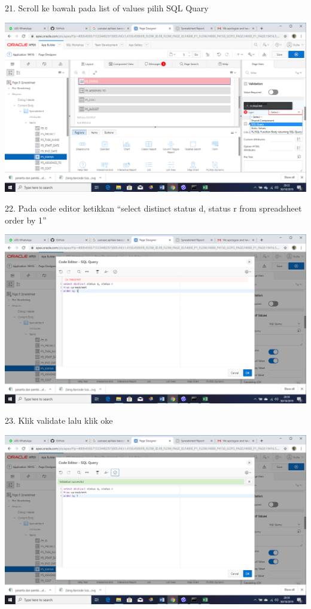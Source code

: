 \documentclass{article}
\begin{document}
\item 21.  Scroll ke bawah pada list of values pilih  SQL Quary
\begin{center}
    \includegraphics[width=10cm\textwidth]{figure/34.png}
\end{center}

\item 22. Pada code editor ketikkan “select distinct status d, status r from spreadsheet order by 1”
\begin{center}
    \includegraphics[width=10cm\textwidth]{figure/36.png}
\end{center}

\item 23. Klik validate lalu klik oke
\begin{center}
     \includegraphics[width=10cm\textwidth]{figure/37.png}
\end{center}





    
    
\end{document}
